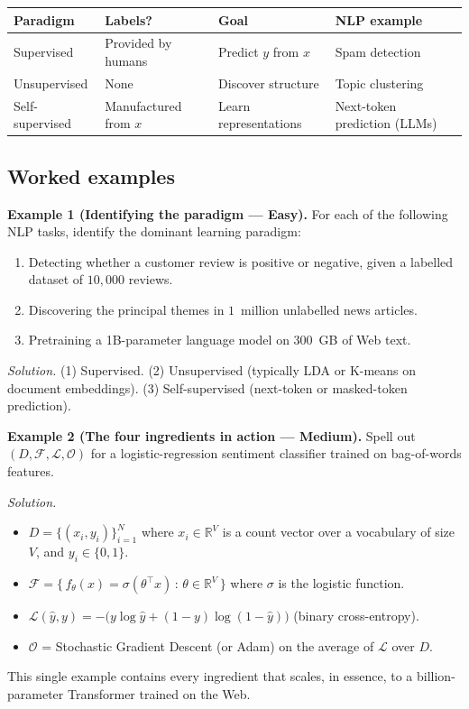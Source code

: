 \begin{center}
\begin{tabular}{|l|l|l|l|}
\hline
\textbf{Paradigm} & \textbf{Labels?} & \textbf{Goal} & \textbf{NLP example} \\
\hline
Supervised & Provided by humans & Predict $y$ from $x$ & Spam detection \\
Unsupervised & None & Discover structure & Topic clustering \\
Self-supervised & Manufactured from $x$ & Learn representations & Next-token prediction (LLMs) \\
\hline
\end{tabular}
\end{center}

\subsection{Worked examples}

\textbf{Example 1 (Identifying the paradigm --- Easy).}
For each of the following NLP tasks, identify the dominant learning paradigm:
\begin{enumerate}
    \item Detecting whether a customer review is positive or negative, given a labelled dataset of $10{,}000$ reviews.
    \item Discovering the principal themes in $1$~million unlabelled news articles.
    \item Pretraining a 1B-parameter language model on $300$~GB of Web text.
\end{enumerate}

\textit{Solution.} (1) Supervised. (2) Unsupervised (typically LDA or K-means on document embeddings). (3) Self-supervised (next-token or masked-token prediction).

\medskip

\textbf{Example 2 (The four ingredients in action --- Medium).}
Spell out $(D, \mathcal{F}, \mathcal{L}, \mathcal{O})$ for a logistic-regression sentiment classifier trained on bag-of-words features.

\textit{Solution.}
\begin{itemize}
    \item $D = \{(x_i, y_i)\}_{i=1}^N$ where $x_i \in \mathbb{R}^V$ is a count vector over a vocabulary of size $V$, and $y_i \in \{0, 1\}$.
    \item $\mathcal{F} = \big\{\, f_\theta(x) = \sigma(\theta^\top x) \,:\, \theta \in \mathbb{R}^V \,\big\}$ where $\sigma$ is the logistic function.
    \item $\mathcal{L}(\hat{y}, y) = -\big(y \log \hat{y} + (1 - y)\log(1 - \hat{y})\big)$ (binary cross-entropy).
    \item $\mathcal{O}$ = Stochastic Gradient Descent (or Adam) on the average of $\mathcal{L}$ over $D$.
\end{itemize}
This single example contains every ingredient that scales, in essence, to a billion-parameter Transformer trained on the Web.

